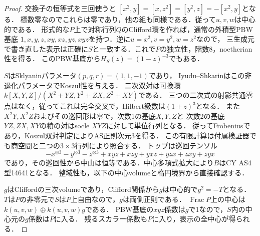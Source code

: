 \begin{proof}
交換子の恒等式を三回使うと
$[x^2,y]=[x,z^2]=[y^2,z]=-[x^2,y]$となる．
標数零なのでこれらは零であり，他の組も同様である．従って$u,v,w$は中心的である．
形式的な$P$上で対称行列$Q$のClifford環を作れば，通常の外積型PBW基底
$1,x,y,z,xy,xz,yz,xyz$を持つ．逆に$u=x^2,v=y^2,w=z^2$なので，
三生成元で書き直した表示は正確に$S$と一致する．これで$P$の独立性，階数8，noetherian性を得る．
このPBW基底から$H_S(z)=(1-z)^{-3}$でもある．

$S$はSklyaninパラメータ$(p,q,r)=(1,1,-1)$であり，
Iyudu--Shkarin\cite[Lemma 3.7, Theorem 1.1]{ISClifford}はこの非退化パラメータでKoszul性を与える．
二次双対は可換環
$k[X,Y,Z]/(X^2+YZ,Y^2+ZX,Z^2+XY)$である．
三つの二次式の射影共通零点はなく，従ってこれは完全交叉で，Hilbert級数は$(1+z)^3$となる．
また$X^2Y,X^2Z$およびその巡回形は零で，次数1の基底$X,Y,Z$と
次数2の基底$YZ,ZX,XY$の積の対はsocle $XYZ$に対して単位行列となる．
従ってFrobeniusであり，Koszul双対判定によりAS正則次元3を得る．
この有限計算は付属検証器でも商空間と二つの$3\times3$行列により照合する．
トップは巡回テンソル
\[
 -x^{\otimes3}-y^{\otimes3}-z^{\otimes3}
 +xyz+xzy+yxz+yzx+zxy+zyx
\]
であり，その巡回性から中山は恒等である．中心多項式拡大により$B$はCY AS4型14641となる．
整域性も，以下の中心volumeと楕円境界から直接確認する．

$g$はCliffordの三次volumeであり，Clifford関係から$g$は中心的で$g^2=-T$となる．
$T$は$P$の非零元で$S$は$P$上自由なので，$g$は両側正則である．
$\operatorname{Frac}P$上の中心は$k(u,v,w)\oplus k(u,v,w)g$である．
PBW基底の$xyz$係数は$g$で1なので，$S$内の中心元の$g$係数は$P$に入る．
残るスカラー係数も$P$に入り，表示の全中心が得られる．


\end{proof}
